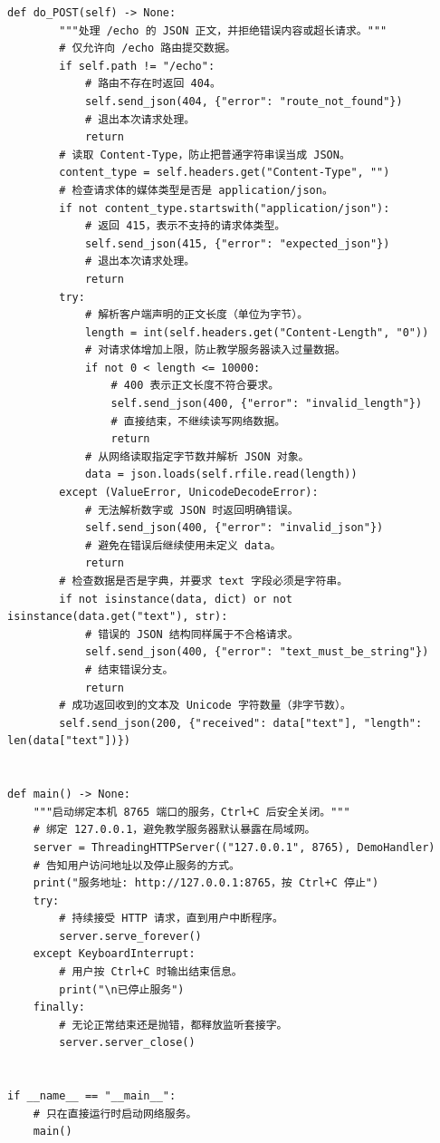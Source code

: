 \documentclass[UTF8,11pt,a4paper]{ctexart}
\begin{document}
\begin{Verbatim}[fontsize=\scriptsize,breaklines=true,breakanywhere=true]
    def do_POST(self) -> None:
        """处理 /echo 的 JSON 正文，并拒绝错误内容或超长请求。"""
        # 仅允许向 /echo 路由提交数据。
        if self.path != "/echo":
            # 路由不存在时返回 404。
            self.send_json(404, {"error": "route_not_found"})
            # 退出本次请求处理。
            return
        # 读取 Content-Type，防止把普通字符串误当成 JSON。
        content_type = self.headers.get("Content-Type", "")
        # 检查请求体的媒体类型是否是 application/json。
        if not content_type.startswith("application/json"):
            # 返回 415，表示不支持的请求体类型。
            self.send_json(415, {"error": "expected_json"})
            # 退出本次请求处理。
            return
        try:
            # 解析客户端声明的正文长度（单位为字节）。
            length = int(self.headers.get("Content-Length", "0"))
            # 对请求体增加上限，防止教学服务器读入过量数据。
            if not 0 < length <= 10000:
                # 400 表示正文长度不符合要求。
                self.send_json(400, {"error": "invalid_length"})
                # 直接结束，不继续读写网络数据。
                return
            # 从网络读取指定字节数并解析 JSON 对象。
            data = json.loads(self.rfile.read(length))
        except (ValueError, UnicodeDecodeError):
            # 无法解析数字或 JSON 时返回明确错误。
            self.send_json(400, {"error": "invalid_json"})
            # 避免在错误后继续使用未定义 data。
            return
        # 检查数据是否是字典，并要求 text 字段必须是字符串。
        if not isinstance(data, dict) or not isinstance(data.get("text"), str):
            # 错误的 JSON 结构同样属于不合格请求。
            self.send_json(400, {"error": "text_must_be_string"})
            # 结束错误分支。
            return
        # 成功返回收到的文本及 Unicode 字符数量（非字节数）。
        self.send_json(200, {"received": data["text"], "length": len(data["text"])})


def main() -> None:
    """启动绑定本机 8765 端口的服务，Ctrl+C 后安全关闭。"""
    # 绑定 127.0.0.1，避免教学服务器默认暴露在局域网。
    server = ThreadingHTTPServer(("127.0.0.1", 8765), DemoHandler)
    # 告知用户访问地址以及停止服务的方式。
    print("服务地址: http://127.0.0.1:8765，按 Ctrl+C 停止")
    try:
        # 持续接受 HTTP 请求，直到用户中断程序。
        server.serve_forever()
    except KeyboardInterrupt:
        # 用户按 Ctrl+C 时输出结束信息。
        print("\n已停止服务")
    finally:
        # 无论正常结束还是抛错，都释放监听套接字。
        server.server_close()


if __name__ == "__main__":
    # 只在直接运行时启动网络服务。
    main()
\end{Verbatim}
\end{document}
